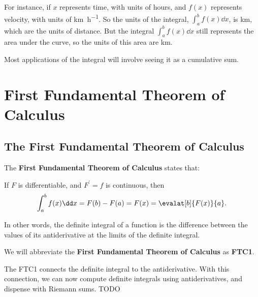 For instance, if $x$ represents time, with units of hours, and $f(x)$ represents velocity, with units of \unit[per-mode=single-symbol]{\km\per\hour}. So the units of the integral, $\int_a^bf(x)\dd x$, is \unit{\km}, which are the units of distance. But the integral $\int_a^bf(x)\dd x$ still represents the area under the curve, so the units of this area are \unit{\km}.

Most applications of the integral will involve seeing it as a cumulative sum.
\section{First Fundamental Theorem of Calculus}
\subsection{The First Fundamental Theorem of Calculus}
The \textbf{First Fundamental Theorem of Calculus} states that:

If $F$ is differentiable, and $F^\prime=f$ is continuous, then
\[\int_a^bf(x)\dd x=F(b)-F(a)=F(x)=\evalat[b]{F(x)}{a}.\]

In other words, the definite integral of a function is the difference between the values of its antiderivative at the limits of the definite integral.

We will abbreviate the \textbf{First Fundamental Theorem of Calculus} as \textbf{FTC1}.

The FTC1 connects the definite integral to the antiderivative. With this connection, we can now compute definite integrals using antiderivatives, and dispense with Riemann sums.
TODO
